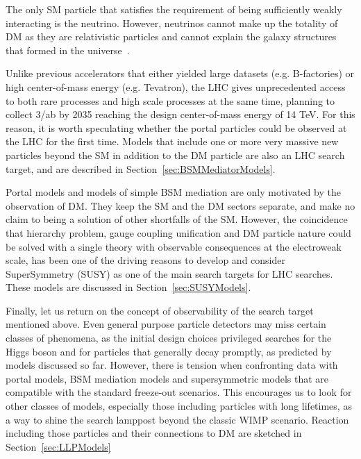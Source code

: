 The only SM particle that satisfies the requirement of being sufficiently weakly interacting is the neutrino. However, neutrinos cannot make up the totality of DM as they 
are relativistic particles and cannot explain the galaxy structures that formed in the universe~\cite{PlehnLecturesDM}. %

Unlike previous accelerators that either yielded large datasets (e.g. B-factories) or high center-of-mass energy (e.g. Tevatron), the LHC gives unprecedented access to both rare processes and high scale processes at the same time, planning to collect 3/ab by 2035 reaching the design center-of-mass energy of 14 TeV. For this reason, it is worth speculating whether the portal particles could be observed at the LHC for the first time. Models that include one or more very massive new particles beyond the SM in addition to the DM particle are also an LHC search target, and are described in Section~\ref{sec:BSMMediatorModels}. 

Portal models and models of simple BSM mediation are only motivated by the observation of DM. They keep the SM and the DM sectors separate, and make no claim to being a solution of other shortfalls of the SM. However, the coincidence that hierarchy problem, gauge coupling unification and DM particle nature could be solved with a single theory with observable consequences at the electroweak scale, has been one of the driving reasons to develop and consider SuperSymmetry (SUSY) as one of the main search targets for LHC searches. These models are discussed in Section~\ref{sec:SUSYModels}.

Finally, let us return on the concept of observability of the search target mentioned above. Even general purpose particle detectors may miss certain classes of phenomena, as the initial design choices privileged searches for the Higgs boson and for particles that generally decay promptly, as predicted by models discussed so far. However, there is tension when confronting data with portal models, BSM mediation models and supersymmetric models that are compatible with the standard freeze-out scenarios. This encourages us to look for other classes of models, especially those including particles with long lifetimes, as a way to shine the search lamppost beyond the classic WIMP scenario. Reaction including those particles and their connections to DM are sketched in Section~\ref{sec:LLPModels}

